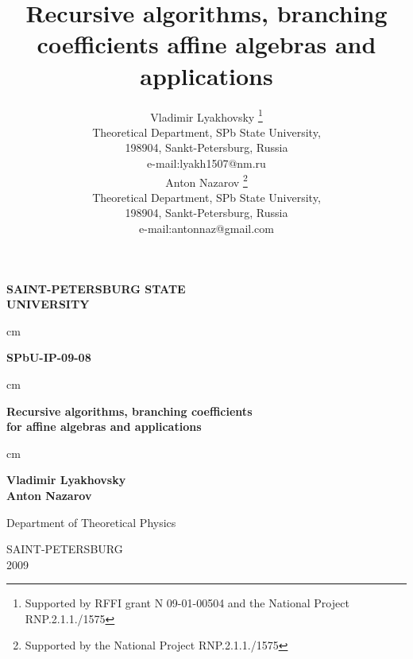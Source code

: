\documentclass[a4paper,12pt]{article}
\theoremstyle{definition} \newtheorem{Def}{Definition}
\begin{document}
\thispagestyle{empty}

\begin{center}
{\Large \bf SAINT-PETERSBURG STATE\\[0.5cm] UNIVERSITY}
\end{center}
 cm
\begin{flushright}
{\large \bf SPbU-IP-09-08}
\end{flushright}
\hfill {}
 cm
\begin{center}
{\Huge \bf Recursive algorithms, branching coefficients \\ for affine algebras and applications\\[0.5cm]
}
\end{center}
 cm
\begin{center}
{\Large \bf
Vladimir Lyakhovsky\\[2mm]
Anton Nazarov}
\end{center}
\vfill
\begin{center}
{\large Department of Theoretical Physics\\
}
\end{center}
\vfill
\begin{center}
SAINT-PETERSBURG \\
2009
\end{center}

\newpage

\title{\textbf{{\Large {Recursive algorithms, branching coefficients affine algebras and applications}}}}
\author{Vladimir Lyakhovsky \thanks{ Supported by
 RFFI grant N 09-01-00504 and the National Project RNP.2.1.1./1575 }\\
Theoretical Department, SPb State University,\\
198904, Sankt-Petersburg, Russia \\
e-mail:lyakh1507@nm.ru \\
[5mm] Anton Nazarov \thanks{ Supported by
the National Project RNP.2.1.1./1575 }\\
Theoretical Department, SPb State University,\\
198904, Sankt-Petersburg, Russia \\
e-mail:antonnaz@gmail.com
}
\maketitle

\begin{abstract}
\end{abstract}
\end{document}
